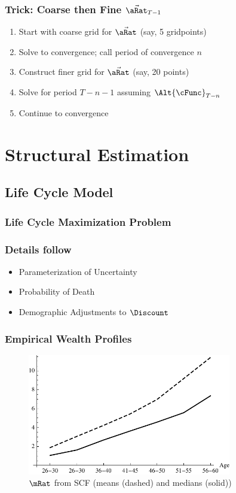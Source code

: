 \documentclass{beamer}
\begin{document}
\begin{frame}
\frametitle{Trick: Coarse then Fine $\vec{\aRat}_{T-1}$}

\begin{enumerate}
\item Start with coarse grid for $\vec{\aRat}$ (say, 5 gridpoints)
\item Solve to convergence; call period of convergence $n$
\item Construct finer grid for $\vec{\aRat}$ (say, 20 points)
\item Solve for period $T-n-1$ assuming $\Alt{\cFunc}_{T-n}$ 
\item Continue to convergence
\end{enumerate}

\end{frame}

\section{Structural Estimation}
\subsection{Life Cycle Model}

\begin{frame}
\frametitle{Life Cycle Maximization Problem}


\end{frame}

\begin{frame}
\frametitle{Details follow~\cite{cagettiWprofiles}}
\begin{itemize}
\item Parameterization of Uncertainty
\item Probability of Death
\item Demographic Adjustments to $\Discount$
\end{itemize}
\end{frame}

\begin{frame}
\frametitle{Empirical Wealth Profiles}
\begin{figure}
    \includegraphics[width=3.5in]{./Figures/PlotMeanMedianSCFcollegeGrads.pdf}
    \caption{$\mRat$ from SCF (means (dashed) and medians (solid))}
    \label{fig:MeanMedianSCF}
\end{figure}
\end{frame}
\end{document}

